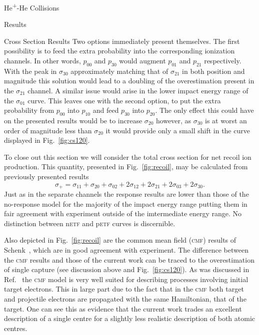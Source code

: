 \documentclass[a5paper, 9 pt]{extreport}
\begin{document}
\begin{chapter}{\texorpdfstring{He\textsuperscript{+}}{He+}-He Collisions \label{chap:hephe}}
\begin{section}{Results \label{sec:hephe-disc}}
\begin{subsection}{Cross Section Results \label{sec:hephe-res}}
         Two options immediately present themselves. The first possibility is to feed the extra
         probability into the corresponding ionization channels. In other words, $p_{00}$ and $p_{30}$
         would augment $p_{01}$ and $p_{21}$ respectively. With the peak in $\sigma_{30}$ approximately
         matching that of $\sigma_{21}$ in both position and magnitude this solution would lead to a
         doubling of the overestimation present in the $\sigma_{21}$ channel. A similar issue would
         arise in the lower impact energy range of the $\sigma_{01}$ curve. This leaves one with the
         second option, to put the extra probability from $p_{00}$ into $p_{10}$ and feed $p_{30}$ into
         $p_{20}$. The only effect this could have on the presented results would be to increase
         $\sigma_{20}$ however, as $\sigma_{30}$ is at worst an order of magnitude less than
         $\sigma_{20}$ it would provide only a small shift in the curve displayed in
         Fig.~\ref{fig:cs120}.

         To close out this section we will consider the total cross section for net recoil ion
         production. This quantity, presented in Fig.~\ref{fig:recoil}, may be calculated from
         previously presented results
         \begin{equation}
            \sigma_{+} = \sigma_{11} + \sigma_{20} + \sigma_{02} + 2 \sigma_{12} + 2 \sigma_{21}
                                     + 2 \sigma_{03} + 2 \sigma_{30}.
         \end{equation}
         Just as in the separate channels the response results are lower than those of the no-response
         model for the majority of the impact energy range putting them in fair agreement with
         experiment outside of the imtermediate energy range. No distinction between n\textsc{etf} and
         p\textsc{etf} curves is discernible.

         Also depicted in Fig.~\ref{fig:recoil} are the common mean field (\textsc{cmf}) results of
         Schenk~\cite{geraldDiss}, which are in good agreement with experiment. The difference between
         the \textsc{cmf} results and those of the current work can be traced to the overestimation of
         single capture (see discussion above and Fig.~\ref{fig:cs120}). As was discussed in
         Ref.~\cite{geraldDiss} the \textsc{cmf} model is very well suited for describing processes
         involving initial target electrons. This in large part due to the fact that in the \textsc{cmf}
         both target and projectile electrons are propagated with the same Hamiltonian, that of the
         target. One can see this as evidence that the current work trades an excellent description of a
         single centre for a slightly less realistic description of both atomic centres.


\end{subsection}
\end{section}
\end{chapter}
\end{document}
